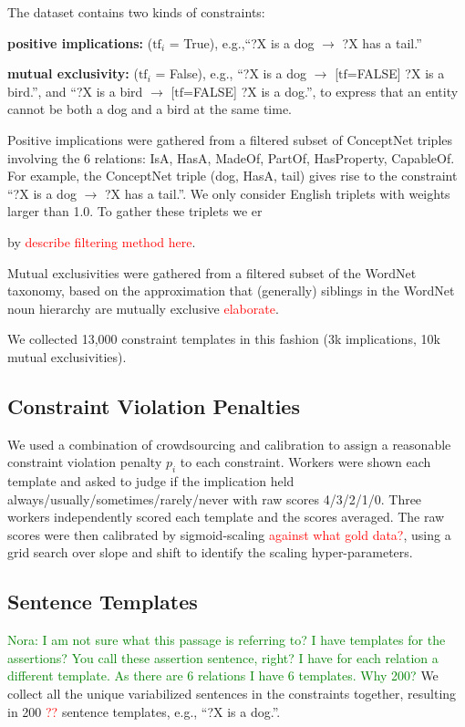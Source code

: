 \documentclass[11pt]{article}
\newcommand{\nk}[1]{\textcolor{green}{Nora: #1}}
\newcommand{\red}[1]{\textcolor{red}{#1}}
\newenvironment{des}{                 %
     \parskip 0cm \begin{list}{}{\parsep 0cm \itemsep 0cm \topsep 0cm}}{
       \end{list}} %
\begin{document}
\noindent
The dataset contains two kinds of constraints:
\begin{des}
\item[{\bf positive implications:}] ($\textrm{tf}_i$ = True), e.g.,``?X is a dog $\rightarrow$ ?X has a tail.''
\item[{\bf mutual exclusivity:}] ($\textrm{tf}_i$ = False), e.g.,
``?X is a dog $\rightarrow$ [$\textrm{tf}$=FALSE] ?X is a bird.'',
and ``?X is a bird $\rightarrow$ [$\textrm{tf}$=FALSE] ?X is a dog.'', to
express that an entity cannot be both a dog and a bird at the same time.

\end{des}
Positive implications were gathered from a filtered subset of ConceptNet triples involving the 6 relations: IsA, HasA, MadeOf, PartOf, HasProperty, CapableOf. For example, the ConceptNet triple (dog, HasA, tail) gives rise to the constraint ``?X is a dog $\rightarrow$ ?X has a tail.''. We only consider English triplets with weights larger than 1.0. To gather these triplets we er 

by \red{describe filtering method here}.

Mutual exclusivities were gathered from a filtered subset of the WordNet taxonomy,
based on the approximation that (generally) siblings in the WordNet noun hierarchy
are mutually exclusive \red{elaborate}.

We collected 13,000 constraint templates in this fashion (3k implications, 10k mutual
exclusivities).

\subsection{Constraint Violation Penalties}

We used a combination of crowdsourcing and calibration to assign a reasonable
constraint violation penalty $p_i$ to each constraint. Workers were shown each
template and asked to judge if the implication held always/usually/sometimes/rarely/never with raw scores 4/3/2/1/0.
Three workers independently scored each template and the scores averaged.
The raw scores were then calibrated by sigmoid-scaling \red{against what gold data?}, using a
grid search over slope and shift to identify the scaling hyper-parameters.

\subsection{Sentence Templates}
\nk{I am not sure what this passage is referring to? I have templates for the assertions? You call these assertion sentence, right? I have for each relation a different template. As there are 6 relations I have 6 templates. Why 200?}
We collect all the unique variabilized sentences in the constraints together,
resulting in 200 \red{??} sentence templates, e.g., ``?X is a dog.''.
\end{document}
